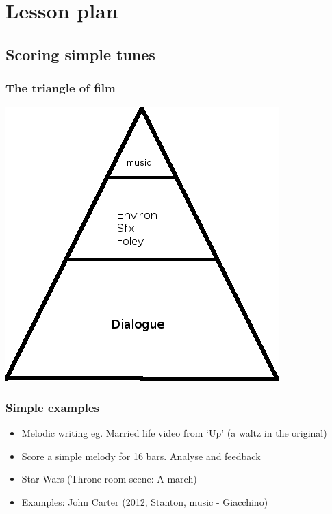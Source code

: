 
\chapter{Lesson plan}
\label{lessonplan}


\section{Scoring simple tunes}

\subsection{The triangle of film}
\includegraphics[scale=2.0]{triangleoffilm} 

\subsection{Simple examples}
\begin{itemize}
\item Melodic writing eg. Married life video from `Up' (a waltz in the original)
\item Score a simple melody for 16 bars. Analyse and feedback
\item Star Wars (Throne room scene: A march)
\item Examples: John Carter (2012, Stanton, music - Giacchino)
\end{itemize}

